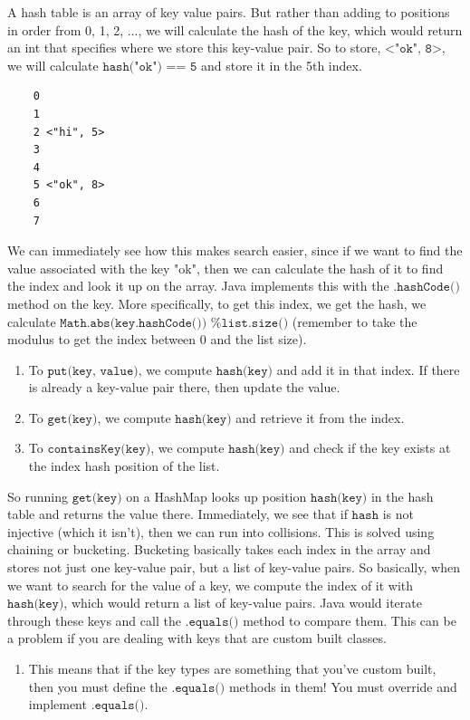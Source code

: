 \documentclass{article}
\begin{document}
    \begin{definition}
    A hash table is an array of key value pairs. But rather than adding to positions in order from 0, 1, 2, ..., we will calculate the hash of the key, which would return an int that specifies where we store this key-value pair. So to store, $\texttt{<"ok", 8>}$, we will calculate $\texttt{hash("ok") == 5}$ and store it in the 5th index.
    \begin{lstlisting}
    0 
    1 
    2 <"hi", 5>
    3 
    4 
    5 <"ok", 8>
    6 
    7 
    \end{lstlisting}
    We can immediately see how this makes search easier, since if we want to find the value associated with the key "ok", then we can calculate the hash of it to find the index and look it up on the array. Java implements this with the $\texttt{.hashCode()}$ method on the key. More specifically, to get this index, we get the hash, we calculate $\texttt{Math.abs(key.hashCode()) \% list.size()}$ (remember to take the modulus to get the index between 0 and the list size). 
    \begin{enumerate}
        \item To $\texttt{put(key, value)}$, we compute $\texttt{hash(key)}$ and add it in that index. If there is already a key-value pair there, then update the value. 
        \item To $\texttt{get(key)}$, we compute $\texttt{hash(key)}$ and retrieve it from the index. 
        \item To $\texttt{containsKey(key)}$, we compute $\texttt{hash(key)}$ and check if the key exists at the index hash position of the list.
    \end{enumerate}
    So running $\texttt{get(key)}$ on a HashMap looks up position $\texttt{hash(key)}$ in the hash table and returns the value there. Immediately, we see that if $\texttt{hash}$ is not injective (which it isn't), then we can run into collisions. This is solved using chaining or bucketing. Bucketing basically takes each index in the array and stores not just one key-value pair, but a list of key-value pairs. So basically, when we want to search for the value of a key, we compute the index of it with $\texttt{hash(key)}$, which would return a list of key-value pairs. Java would iterate through these keys and call the $\texttt{.equals()}$ method to compare them. This can be a problem if you are dealing with keys that are custom built classes.
    \begin{enumerate}
        \item This means that if the key types are something that you've custom built, then you must define the $\texttt{.equals()}$ methods in them! You must override and implement $\texttt{.equals()}$. 

\end{enumerate}
\end{definition}
\end{document}
